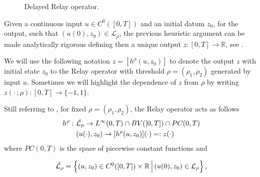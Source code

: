 \documentclass[12pt]{article}
\newcommand{\R}{\mathbb{R}}
\newcommand{\LL}{\mathcal{L}}
\newcommand{\p}{\rho}
\newcommand{\1}{\mathds{1}}
\theoremstyle{definition}
\begin{document}
\begin{figure}
    \centering
    \caption{Delayed Relay operator.}
    \label{fig: Relay}
\end{figure} 

Given a continuous input $u\in C^0([0,T])$ and an initial datum $z_0$, for the output, such that $(u(0),z_0)\in \LL_\p$, the previous heuristic argument can be made analytically rigorous defining then a unique output $z:[0,T]\to\mathbb{R}$, see \cite[Chapter~IV]{AVH}.

We will use the following notation $z=[h^\p(u,z_0)]$ to denote the output $z$ with initial state $z_0$ to the Relay operator with threshold $\p=(\p_1,\p_2)$ generated by input $u$. Sometimes we will highlight the dependence of $z$ from $\p$ by writing $z(\cdot\,; \p):[0,T] \to \{-1,1\}.$\par

Still referring to \cite{AVH}, for fixed $\p=(\p_1,\p_2)$, the Relay operator acts as follows
\[\begin{split}
h^\p: ~& \tilde{\cal L_\p}\to L^\infty(0,T)\cap BV([0,T])\cap PC(0,T)\\&(u(\cdot),z_0)\to [h^\p(u,z_0)](\cdot)=:z(\cdot) \end{split}\]
where $PC(0,T)$ is the space of piecewise constant functions and

\[
\tilde{\cal L_\p}=\left\{(u,z_0)\in C^0([0,T])\times\R\,\Big|\,(u(0),z_0)\in{\cal L_\p}\right\},
\]
\end{document}
